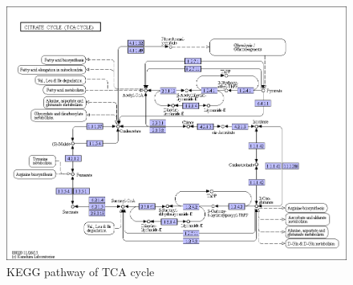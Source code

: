 \documentclass[12pt, a4paper]{report}
\begin{document}
\begin{figure}[H]
	\centering	
	\includegraphics[width=320pt]{pics/tcacycle}
	\caption[KEGG pathway of TCA cycle]
	{KEGG pathway of TCA cycle}
	\label{fig:tcacycle}
\end{figure}
\end{document}

